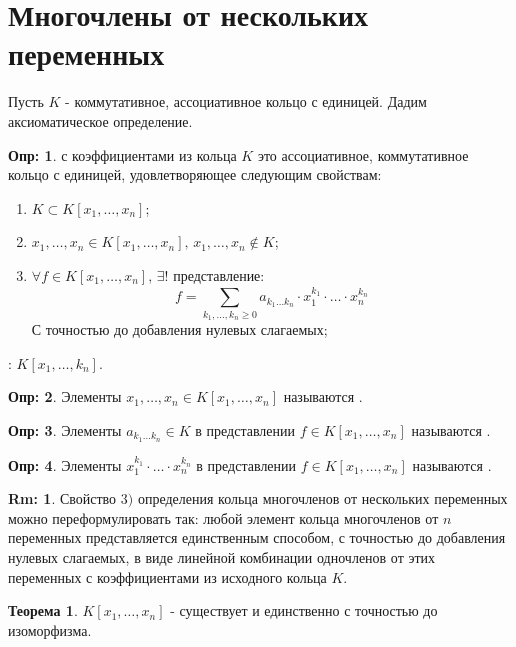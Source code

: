 \documentclass[12pt]{article}
\theoremstyle{definition}
\newtheorem{defn}{Опр:}
\newtheorem{rem}{Rm:}
\newtheorem{theorem}{Теорема}
\newcommand{\ddsum}[2]{\displaystyle\sum\limits_{#1}^{#2}}
\begin{document}
\section*{Многочлены от нескольких переменных}
Пусть $K$ - коммутативное, ассоциативное кольцо с единицей. Дадим аксиоматическое определение.
\begin{defn}
	 с коэффициентами из кольца $K$ это ассоциативное, коммутативное кольцо с единицей, удовлетворяющее следующим свойствам:
	\begin{enumerate}[label=\arabic*)]
		\item $K \subset K[x_1,\dotsc, x_n]$;
		\item $x_1,\dotsc,x_n \in K[x_1,\dotsc, x_n], \, x_1,\dotsc, x_n \not\in K$;
		\item $\forall f \in K[x_1,\dotsc,x_n], \, \exists!$ представление: 
		$$
			f = \ddsum{k_1,\dotsc,k_n \geq 0}{}a_{k_1\dotsc k_n}{\cdot}x_1^{k_1}{\cdot}\dotsc{\cdot}x_n^{k_n}
		$$ 
		С точностью до добавления нулевых слагаемых;
	\end{enumerate}
	\textbf{}: $K[x_1,\dotsc, k_n]$.
\end{defn}
\begin{defn}
	Элементы $x_1,\dotsc,x_n \in K[x_1,\dotsc, x_n]$ называются .
\end{defn}
\begin{defn}
	Элементы $a_{k_1\dotsc k_n} \in K$ в представлении $f \in K[x_1,\dotsc,x_n]$ называются .
\end{defn}
\begin{defn}
	Элементы $x_1^{k_1}{\cdot}\dotsc{\cdot}x_n^{k_n}$ в представлении $f \in K[x_1,\dotsc,x_n]$ называются .
\end{defn}
\begin{rem}
	Свойство $3)$ определения кольца многочленов от нескольких переменных можно переформулировать так: любой элемент кольца многочленов от $n$ переменных представляется единственным способом, с точностью до добавления нулевых слагаемых, в виде линейной комбинации одночленов от этих переменных с коэффициентами из исходного кольца $K$.
\end{rem}

\begin{theorem}
	$K[x_1,\dotsc,x_n]$ - существует и единственно с точностью до изоморфизма.
\end{theorem}
\end{document}
